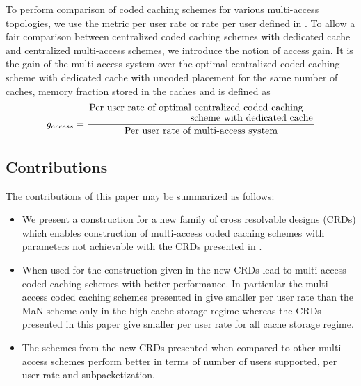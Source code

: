 \documentclass[conference]{IEEEtran}
\begin{document}
	To perform comparison of coded caching schemes for various multi-access topologies, we use the metric per user rate or rate per user defined in \cite{KNRarXiv}.
	To allow a fair comparison between centralized coded caching schemes with dedicated cache and centralized multi-access schemes, we introduce the notion of access gain. It is the gain of the multi-access system over the optimal centralized coded caching scheme  with dedicated cache with uncoded placement for the same number of caches, memory fraction stored in the caches and is defined as
	$$g_{access} = \frac{\splitfrac{\text{Per user rate of optimal centralized coded caching}}{\text{scheme  with dedicated cache}}}{\text{Per user rate of multi-access system}}$$
	
\subsection{Contributions}
\label{sec1E}
	The contributions of this paper may be summarized as follows:

\begin{itemize}
\item We present a construction for a new family of cross resolvable designs (CRDs) which enables construction of multi-access coded caching schemes with parameters not achievable with the CRDs presented in \cite{KNRarXiv}.

\item When used for the construction given in \cite{KNRarXiv} the new CRDs lead to multi-access coded caching schemes with better performance. In particular the multi-access coded caching schemes presented in \cite{KNRarXiv} give smaller per user rate than the MaN scheme only in the high cache storage regime whereas the CRDs presented in this paper give smaller per user rate for all cache storage regime. 

%		
		
\item The schemes from the new CRDs presented  when compared to other multi-access schemes perform better in terms of number of users supported, per user rate and subpacketization.
	\end{itemize}
\end{document}
